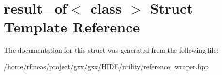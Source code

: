 \hypertarget{structresult__of}{}\section{result\+\_\+of$<$ class $>$ Struct Template Reference}
\label{structresult__of}


The documentation for this struct was generated from the following file\+:\begin{DoxyCompactItemize}
\item 
/home/rfmeas/project/gxx/gxx/\+H\+I\+D\+E/utility/reference\+\_\+wraper.\+hpp\end{DoxyCompactItemize}
